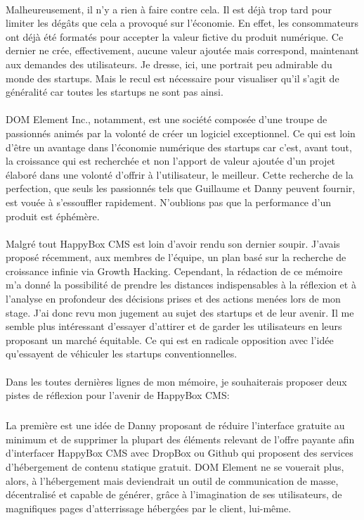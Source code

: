 \documentclass[11pt, a4paper ]{article}
\begin{document}
\begin{spacing}{1.5}
\paragraph{}
Malheureusement, il n'y a rien à faire contre cela. Il est déjà trop tard pour limiter les dégâts que cela a provoqué sur l'économie. En effet, les consommateurs ont déjà été formatés pour accepter la valeur fictive du produit numérique. Ce dernier ne crée, effectivement, aucune valeur ajoutée mais correspond, maintenant aux demandes des utilisateurs. Je dresse, ici, une portrait peu admirable du monde des  startups. Mais le recul est nécessaire pour visualiser qu'il s'agit de généralité car toutes les startups ne sont pas ainsi.

\paragraph{}
DOM Element Inc., notamment, est une société composée d'une troupe de passionnés animés par la volonté de créer un logiciel exceptionnel. Ce qui est loin d'être un avantage dans l’économie numérique des startups car c'est, avant tout, la croissance qui est recherchée et non l'apport de valeur ajoutée d'un projet élaboré dans une volonté d'offrir à l'utilisateur, le meilleur.
 Cette recherche de la perfection, que seuls les passionnés tels que Guillaume et Danny peuvent fournir, est vouée à s’essouffler rapidement. N'oublions pas que la performance d'un produit est éphémère.

\paragraph{}
Malgré tout HappyBox CMS est loin d'avoir rendu son dernier soupir. J'avais proposé récemment, aux membres de l'équipe, un plan basé sur la recherche de croissance infinie via Growth Hacking. Cependant, la rédaction de ce mémoire m'a donné la possibilité de prendre les distances indispensables à la réflexion et à l'analyse en profondeur des décisions prises et des actions menées lors de mon stage. J'ai donc revu mon jugement au sujet des startups et de leur avenir.
Il me semble plus intéressant d'essayer d'attirer et de garder les utilisateurs en leurs proposant un marché équitable. Ce qui est en radicale opposition avec l'idée qu'essayent de véhiculer les startups conventionnelles.
\paragraph{}
Dans les toutes dernières lignes de mon mémoire, je souhaiterais proposer deux pistes de réflexion pour l'avenir de HappyBox CMS:
\subparagraph{}
La première est une idée de Danny proposant de réduire l'interface gratuite au minimum et de supprimer la plupart des éléments relevant de l'offre payante afin d'interfacer HappyBox CMS avec DropBox ou Github qui proposent des services d'hébergement de contenu statique gratuit. DOM Element ne se vouerait plus, alors, à l'hébergement mais deviendrait un outil de communication de masse, décentralisé et capable de générer, grâce à l'imagination de ses utilisateurs, de magnifiques pages d'atterrissage hébergées par le client, lui-même.


\end{spacing}
\end{document}
